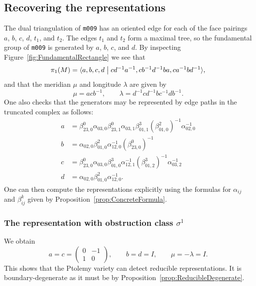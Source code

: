 \documentclass[11pt]{amsart}
\theoremstyle{plain}
\theoremstyle{definition}
\numberwithin{equation}{section}
\begin{document}
\subsection{Recovering the representations}\label{sec:RecoverRepExample}
The dual triangulation of \texttt{m009} has an oriented edge for each of the face pairings $a$, $b$, $c$, $d$, $t_1$, and $t_2$. The edges $t_1$ and $t_2$ form a maximal tree, so the fundamental group of \texttt{m009} is generated by $a$, $b$, $c$, and $d$. By inspecting Figure~\ref{fig:FundamentalRectangle} we see that
\begin{equation}
\pi_1(M)=\langle a,b,c,d\bigm \vert cd^{-1}a^{-1},cb^{-1}d^{-1}ba,ca^{-1}bd^{-1}\rangle,
\end{equation}
and that the meridian $\mu$ and longitude $\lambda$ are given by
\begin{equation}
\mu=acb^{-1},\qquad \lambda=d^{-1}cd^{-1}bc^{-1}db^{-1}.
\end{equation}
One also checks that the generators may be represented by edge paths in the truncated complex as follows:
\begin{equation}
\begin{aligned}
a&=\beta^0_{23,0}\alpha_{03,0}\beta^0_{23,1}\alpha_{03,1}\beta^3_{01,1}(\beta^2_{01,0})^{-1}\alpha_{02,0}^{-1}\\
b&=\alpha_{02,0}\beta^2_{01,0}\alpha_{12,0}^{-1}(\beta^0_{23,0})^{-1}\\
c&=\beta^0_{23,0}\alpha_{03,0}\beta^3_{01,0}\alpha_{12,1}^{-1}(\beta^3_{01,2})^{-1}\alpha_{03,2}^{-1}\\
d&=\alpha_{02,0}\beta^2_{01,0}\alpha_{12,0}^{-1}.
\end{aligned}
\end{equation}
One can then compute the representations explicitly using the formulas for $\alpha_{ij}$ and $\beta^k_{ij}$ given by Proposition~\ref{prop:ConcreteFormula}.

\subsubsection{The representation with obstruction class $\sigma^1$}\label{sub:Reducible}
We obtain
\begin{equation}\label{eq:ReducedRep}
a=c=\begin{pmatrix}0&-1\\1&0\end{pmatrix},\qquad b=d=I,\qquad\mu=-\lambda=I.
\end{equation}
This shows that the Ptolemy variety can detect reducible representations. It is boundary-degenerate as it must be by Proposition~\ref{prop:ReducibleDegenerate}.
\end{document}
